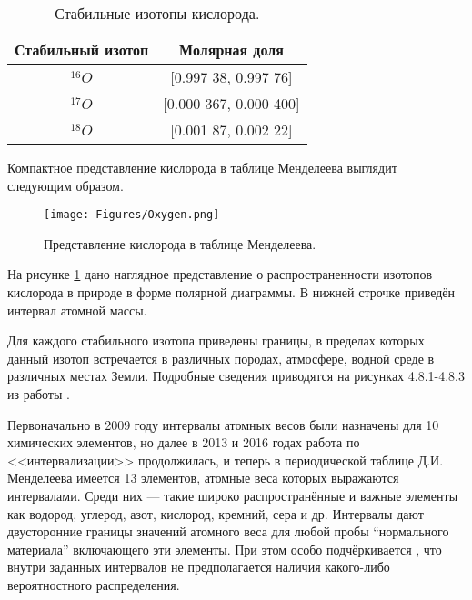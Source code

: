 \documentclass[a5paper,openany]{book}
\begin{document}
\begin{table}[h!]
	\centering
	\caption{Стабильные изотопы кислорода.} 
	\medskip 
	\begin{tabular}{|c|c|}
		\hline
		Стабильный  изотоп & Молярная доля \\
		\hline 
		$^{16}O$ & [0.997 38, 0.997 76] \\
		$^{17}O$ & [0.000 367, 0.000 400] \\
		$^{18}O$ & [0.001 87, 0.002 22] \\			
		\hline
	\end{tabular}
	\label{IUPACOxygen}
\end{table} 


Компактное представление кислорода в таблице Менделеева выглядит следующим образом.

\begin{figure}[ht] 
	\centering\small
	\texttt{[image: Figures/Oxygen.png]}
	\caption{Представление кислорода в таблице Менделеева.} 
	\label{f:Oxygen}
\end{figure}	
На рисунке \ref{f:Oxygen} дано наглядное представление о распространенности изотопов кислорода в природе в форме полярной диаграммы. В нижней строчке приведён интервал атомной массы.

Для каждого стабильного изотопа приведены границы, в пределах которых данный изотоп 
встречается в различных породах, атмосфере, водной среде в различных местах Земли. 
Подробные сведения приводятся на рисунках 4.8.1-4.8.3 из работы \cite{IUPAC}. 


Первоначально в 2009 году интервалы атомных весов были назначены для 10 химических 
элементов, но далее в 2013 и 2016 годах работа по <<интервализации>> продолжилась, 
и теперь в периодической таблице Д.И.\,Менделеева имеется 13 элементов, атомные веса 
которых выражаются интервалами. Среди них --- такие широко распространённые и важные 
элементы как водород, углерод, азот, кислород, кремний, сера и др. Интервалы дают 
двусторонние границы значений атомного веса для любой пробы ``нормального материала'' 
включающего эти элементы. При этом особо подчёркивается \cite{IUPAC}, что внутри 
заданных интервалов не предполагается наличия какого-либо вероятностного распределения. 
\end{document}
